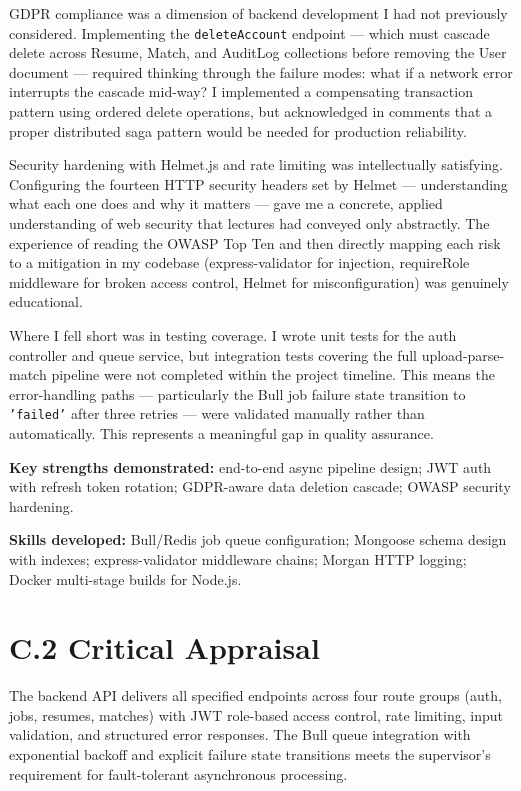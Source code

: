 GDPR compliance was a dimension of backend development I had not previously considered. Implementing the \texttt{deleteAccount} endpoint --- which must cascade delete across Resume, Match, and AuditLog collections before removing the User document --- required thinking through the failure modes: what if a network error interrupts the cascade mid-way? I implemented a compensating transaction pattern using ordered delete operations, but acknowledged in comments that a proper distributed saga pattern would be needed for production reliability.

Security hardening with Helmet.js and rate limiting was intellectually satisfying. Configuring the fourteen HTTP security headers set by Helmet --- understanding what each one does and why it matters --- gave me a concrete, applied understanding of web security that lectures had conveyed only abstractly. The experience of reading the OWASP Top Ten \citep{OWASP2021} and then directly mapping each risk to a mitigation in my codebase (express-validator for injection, requireRole middleware for broken access control, Helmet for misconfiguration) was genuinely educational.

Where I fell short was in testing coverage. I wrote unit tests for the auth controller and queue service, but integration tests covering the full upload-parse-match pipeline were not completed within the project timeline. This means the error-handling paths --- particularly the Bull job failure state transition to \texttt{'failed'} after three retries --- were validated manually rather than automatically. This represents a meaningful gap in quality assurance.

\textbf{Key strengths demonstrated:} end-to-end async pipeline design; JWT auth with refresh token rotation; GDPR-aware data deletion cascade; OWASP security hardening.

\textbf{Skills developed:} Bull/Redis job queue configuration; Mongoose schema design with indexes; express-validator middleware chains; Morgan HTTP logging; Docker multi-stage builds for Node.js.

\section*{C.2 Critical Appraisal}

The backend API delivers all specified endpoints across four route groups (auth, jobs, resumes, matches) with JWT role-based access control, rate limiting, input validation, and structured error responses. The Bull queue integration with exponential backoff and explicit failure state transitions meets the supervisor's requirement for fault-tolerant asynchronous processing.

